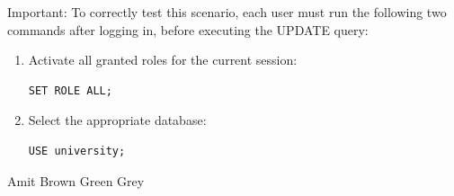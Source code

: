 \documentclass[12pt]{exam}
\begin{document}
\begin{questions}
\begin{samepage}
Important: To correctly test this scenario, each user must run the following two commands after logging in, before executing the UPDATE query:\par\vspace{0.5em}
\begin{enumerate}
    \item Activate all granted roles for the current session:
    \begin{verbatim}
SET ROLE ALL;
    \end{verbatim}

    \item Select the appropriate database:
    \begin{verbatim}
USE university;
    \end{verbatim}
\end{enumerate}
\begin{checkboxes}
    \CorrectChoice Amit
    \CorrectChoice Brown
    \choice Green
    \CorrectChoice Grey
\end{checkboxes}
\vspace{1em}
\end{samepage}

\end{questions}
\end{document}
